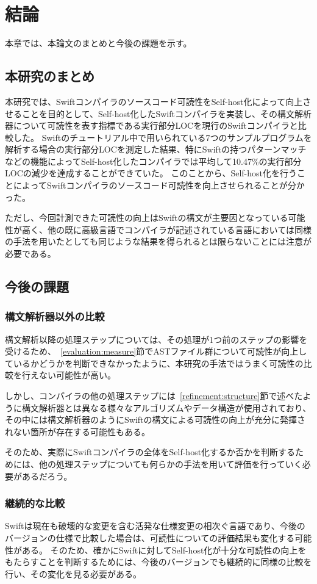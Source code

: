 \chapter{結論}
\label{conclusion}

本章では、本論文のまとめと今後の課題を示す。

\section{本研究のまとめ}

本研究では、Swiftコンパイラのソースコード可読性をSelf-host化によって向上させることを目的として、Self-host化したSwiftコンパイラを実装し、その構文解析器について可読性を表す指標である実行部分LOCを現行のSwiftコンパイラと比較した。
Swiftのチュートリアル中で用いられている7つのサンプルプログラムを解析する場合の実行部分LOCを測定した結果、特にSwiftの持つパターンマッチなどの機能によってSelf-host化したコンパイラでは平均して10.47\%の実行部分LOCの減少を達成することができていた。
このことから、Self-host化を行うことによってSwiftコンパイラのソースコード可読性を向上させられることが分かった。

ただし、今回計測できた可読性の向上はSwiftの構文が主要因となっている可能性が高く、他の既に高級言語でコンパイラが記述されている言語においては同様の手法を用いたとしても同じような結果を得られるとは限らないことには注意が必要である。

\section{今後の課題}

\subsection{構文解析器以外の比較}

構文解析以降の処理ステップについては、その処理が1つ前のステップの影響を受けるため、~\ref{evaluation:measure}節でASTファイル群について可読性が向上しているかどうかを判断できなかったように、本研究の手法ではうまく可読性の比較を行えない可能性が高い。

しかし、コンパイラの他の処理ステップには~\ref{refinement:structure}節で述べたように構文解析器とは異なる様々なアルゴリズムやデータ構造が使用されており、その中には構文解析器のようにSwiftの構文による可読性の向上が充分に発揮されない箇所が存在する可能性もある。

そのため、実際にSwiftコンパイラの全体をSelf-host化するか否かを判断するためには、他の処理ステップについても何らかの手法を用いて評価を行っていく必要があるだろう。

\subsection{継続的な比較}

Swiftは現在も破壊的な変更を含む活発な仕様変更の相次ぐ言語であり、今後のバージョンの仕様で比較した場合は、可読性についての評価結果も変化する可能性がある。
そのため、確かにSwiftに対してSelf-host化が十分な可読性の向上をもたらすことを判断するためには、今後のバージョンでも継続的に同様の比較を行い、その変化を見る必要がある。

